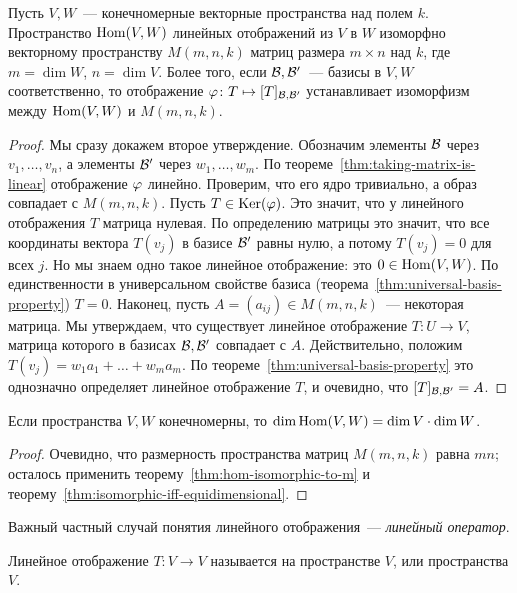 \begin{theorem}\label{thm:hom-isomorphic-to-m}
Пусть $V,W$~--- конечномерные векторные пространства над полем $k$.
Пространство $\operatorname{Hom}(V,W)$ линейных отображений из $V$ в $W$ изоморфно
векторному пространству $M(m,n,k)$ матриц размера $m\times n$ над $k$,
где $m=\dim W$, $n=\dim V$.
Более того, если $\mathcal B,\mathcal B'$~--- базисы в $V,W$ соответственно, то
отображение $\varphi\colon T\mapsto [T]_{\mathcal B,\mathcal B'}$ устанавливает
изоморфизм между $\operatorname{Hom}(V,W)$ и $M(m,n,k)$.
\end{theorem}
\begin{proof}
Мы сразу докажем второе утверждение.
Обозначим элементы $\mathcal B$ через $v_1,\dots,v_n$,
а элементы $\mathcal B'$ через $w_1,\dots,w_m$.
По теореме~\ref{thm:taking-matrix-is-linear}
отображение $\varphi$ линейно. Проверим, что его ядро тривиально, а образ
совпадает с $M(m,n,k)$. Пусть $T\in\operatorname{Ker}(\varphi)$. Это значит, что у линейного
отображения $T$ матрица нулевая. По определению матрицы это значит,
что все координаты вектора $T(v_j)$ в базисе $\mathcal B'$ равны нулю,
а потому $T(v_j)=0$ для всех $j$. Но мы знаем одно такое линейное отображение:
это $0\in\operatorname{Hom}(V,W)$. По единственности в универсальном свойстве
базиса (теорема~\ref{thm:universal-basis-property}) $T=0$.
Наконец, пусть $A=(a_{ij})\in M(m,n,k)$~--- некоторая матрица. Мы утверждаем, что существует
линейное отображение $T\colon U\to V$, матрица которого в базисах $\mathcal B,\mathcal B'$
совпадает с $A$. Действительно, положим
$T(v_j) = w_1a_1+\dots+w_ma_m$. По теореме~\ref{thm:universal-basis-property}
это однозначно определяет линейное отображение $T$, и очевидно, что
$[T]_{\mathcal B,\mathcal B'} = A$.
\end{proof}

\begin{corollary}
Если пространства $V,W$ конечномерны, то $\dim\operatorname{Hom}(V,W) = \dim V\cdot\dim W$.
\end{corollary}
\begin{proof}
Очевидно, что размерность пространства матриц $M(m,n,k)$ равна $mn$; осталось
применить теорему~\ref{thm:hom-isomorphic-to-m}
и теорему~\ref{thm:isomorphic-iff-equidimensional}.
\end{proof}

Важный частный случай понятия линейного отображения~--- {\em линейный оператор}.
\begin{definition}
Линейное отображение $T\colon V\to V$ называется 
на пространстве $V$, или  пространства $V$.
\end{definition}

